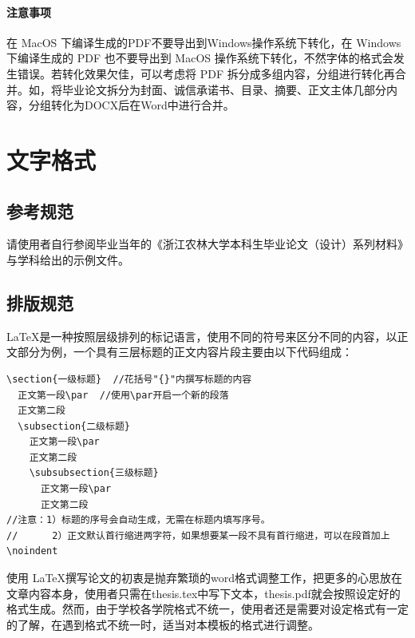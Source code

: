 \documentclass[AutoFakeBold]{ZafuThesis}
\begin{document}
\paragraph{注意事项}
在 MacOS 下编译生成的PDF不要导出到Windows操作系统下转化，在 Windows 下编译生成的 PDF 也不要导出到 MacOS 操作系统下转化，不然字体的格式会发生错误。若转化效果欠佳，可以考虑将 PDF 拆分成多组内容，分组进行转化再合并。如，将毕业论文拆分为封面、诚信承诺书、目录、摘要、正文主体几部分内容，分组转化为DOCX后在Word中进行合并。



\section{文字格式}
\subsection{参考规范}
请使用者自行参阅毕业当年的《浙江农林大学本科生毕业论文（设计）系列材料》与学科给出的示例文件。
\subsection{排版规范}
\LaTeX 是一种按照层级排列的标记语言，使用不同的符号来区分不同的内容，以正文部分为例，一个具有三层标题的正文内容片段主要由以下代码组成：
\begin{lstlisting}[]
\section{一级标题}  //花括号"{}"内撰写标题的内容
  正文第一段\par  //使用\par开启一个新的段落
  正文第二段
  \subsection{二级标题}
    正文第一段\par
    正文第二段
    \subsubsection{三级标题}
      正文第一段\par
      正文第二段
//注意：1）标题的序号会自动生成，无需在标题内填写序号。
//      2）正文默认首行缩进两字符，如果想要某一段不具有首行缩进，可以在段首加上\noindent
\end{lstlisting}

\par
使用 \LaTeX 撰写论文的初衷是抛弃繁琐的word格式调整工作，把更多的心思放在文章内容本身，使用者只需在thesis.tex中写下文本，thesis.pdf就会按照设定好的格式生成。然而，由于学校各学院格式不统一，使用者还是需要对设定格式有一定的了解，在遇到格式不统一时，适当对本模板的格式进行调整。\par
\end{document}
